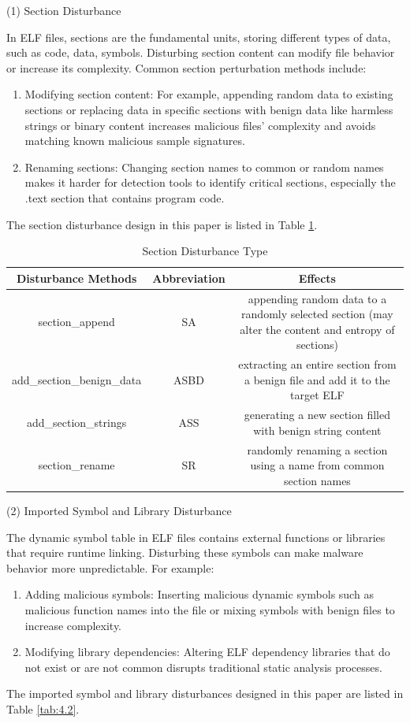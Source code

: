 (1) Section Disturbance

In ELF files, sections are the fundamental units, storing different types of data, such as code, data, symbols. Disturbing section content can modify file behavior or increase its complexity. Common section perturbation methods include:
\begin{enumerate}

\item Modifying section content: For example, appending random data to existing sections or replacing data in specific sections with benign data like harmless strings or binary content increases malicious files’ complexity and avoids matching known malicious sample signatures.

\item Renaming sections: Changing section names to common or random names makes it harder for detection tools to identify critical sections, especially the .text section that contains program code.

\end{enumerate}

The section disturbance design in this paper is listed in Table \ref{tab:4.1}.

\begin{table}[htbp]
	\centering
	\caption{Section Disturbance Type}\label{tab:4.1}
	\begin{tabular*}{\textwidth}{@{\extracolsep{\fill}}ccc}
		\toprule
		Disturbance Methods & Abbreviation & Effects \\
		\midrule
		section\_append & SA & appending random data to a randomly selected section (may alter the content and entropy of sections) \\
		add\_section\_benign\_data & ASBD & extracting an entire section from a benign file and add it to the target ELF \\
		add\_section\_strings & ASS & generating a new section filled with benign string content \\
		section\_rename & SR & randomly renaming a section using a name from common section names \\
		\bottomrule
	\end{tabular*}
\end{table}


(2) Imported Symbol and Library Disturbance

The dynamic symbol table in ELF files contains external functions or libraries that require runtime linking. Disturbing these symbols can make malware behavior more unpredictable. For example:
\begin{enumerate}
	
\item Adding malicious symbols: Inserting malicious dynamic symbols such as malicious function names into the file or mixing symbols with benign files to increase complexity.

\item Modifying library dependencies: Altering ELF dependency libraries that do not exist or are not common disrupts traditional static analysis processes.
\end{enumerate}
The imported symbol and library disturbances designed in this paper are listed in Table \ref{tab:4.2}.

